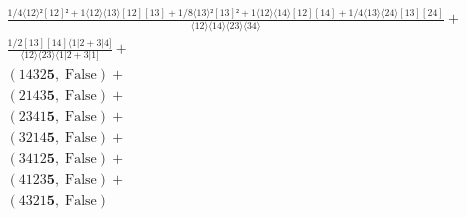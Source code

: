 \documentclass[varwidth, border=5pt]{standalone}
\begin{document}
\begin{my}
$\begin{gathered}
\scriptscriptstyle\frac{1/4⟨12⟩²[12]²+1⟨12⟩⟨13⟩[12][13]+1/8⟨13⟩²[13]²+1⟨12⟩⟨14⟩[12][14]+1/4⟨13⟩⟨24⟩[13][24]}{⟨12⟩⟨14⟩⟨23⟩⟨34⟩} +\\
\scriptscriptstyle\frac{1/2[13][14]⟨1|2+3|4]}{⟨12⟩⟨23⟩⟨1|2+3|1]} +\\
\scriptscriptstyle(1432𝟓,\;\text{False}) +\\
\scriptscriptstyle(2143𝟓,\;\text{False}) +\\
\scriptscriptstyle(2341𝟓,\;\text{False}) +\\
\scriptscriptstyle(3214𝟓,\;\text{False}) +\\
\scriptscriptstyle(3412𝟓,\;\text{False}) +\\
\scriptscriptstyle(4123𝟓,\;\text{False}) +\\
\scriptscriptstyle(4321𝟓,\;\text{False}) \phantom{+}
\end{gathered}$
\end{my}
\end{document}
